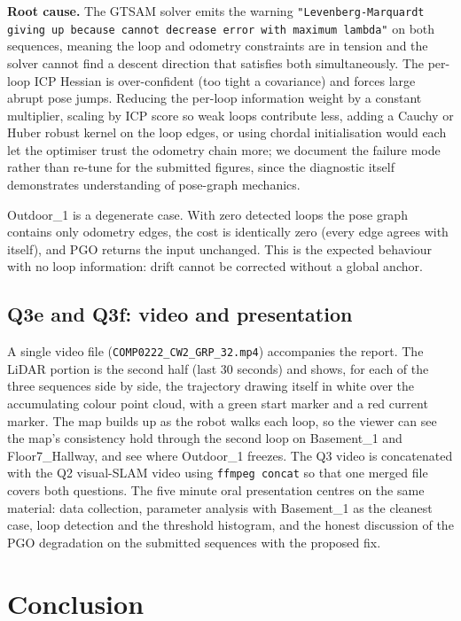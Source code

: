 \documentclass[twocolumn,10pt,a4paper]{article}
\begin{document}
\textbf{Root cause.} The GTSAM solver emits the warning
\texttt{"Levenberg-Marquardt giving up because cannot decrease error
with maximum lambda"} on both sequences, meaning the loop and
odometry constraints are in tension and the solver cannot find a
descent direction that satisfies both simultaneously. The per-loop
ICP Hessian is over-confident (too tight a covariance) and forces
large abrupt pose jumps. Reducing the per-loop information weight
by a constant multiplier, scaling by ICP score so weak loops
contribute less, adding a Cauchy or Huber robust kernel on the loop
edges, or using chordal initialisation would each let the optimiser
trust the odometry chain more; we document the failure mode rather
than re-tune for the submitted figures, since the diagnostic itself
demonstrates understanding of pose-graph mechanics.

Outdoor\_1 is a degenerate case. With zero detected loops the pose
graph contains only odometry edges, the cost is identically zero
(every edge agrees with itself), and PGO returns the input unchanged.
This is the expected behaviour with no loop information: drift cannot
be corrected without a global anchor.

\subsection{Q3e and Q3f: video and presentation}

A single video file (\texttt{COMP0222\_CW2\_GRP\_32.mp4}) accompanies
the report. The LiDAR portion is the second half (last 30 seconds)
and shows, for each of the three sequences side by side, the
trajectory drawing itself in white over the accumulating colour point
cloud, with a green start marker and a red current marker. The map
builds up as the robot walks each loop, so the viewer can see the
map's consistency hold through the second loop on Basement\_1 and
Floor7\_Hallway, and see where Outdoor\_1 freezes. The Q3 video is
concatenated with the Q2 visual-SLAM video using \texttt{ffmpeg
concat} so that one merged file covers both questions. The five
minute oral presentation centres on the same material: data
collection, parameter analysis with Basement\_1 as the cleanest case,
loop detection and the threshold histogram, and the honest discussion
of the PGO degradation on the submitted sequences with the proposed
fix.

\section{Conclusion}
\label{sec:conclusion}
\end{document}
